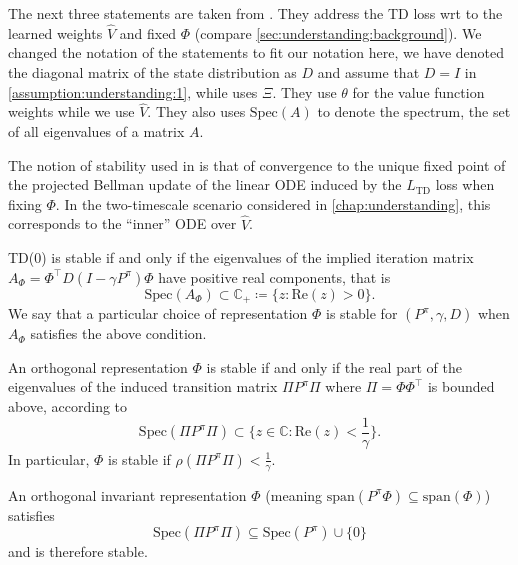 The next three statements are taken from \textcite{ghosh2020representations}.  They address the TD loss wrt to the learned weights $\hat{V}$ and fixed $\Phi$ (compare \autoref{sec:understanding:background}).
We changed the notation of the statements to fit our notation here, we have denoted the diagonal matrix of the state distribution as $D$ and assume that $D=I$ in \autoref{assumption:understanding:1}, while \textcite{ghosh2020representations} uses $\Xi$. They use $\theta$ for the value function weights while we use $\hat{V}$.
They also uses $\text{Spec}(A)$ to denote the spectrum, the set of all eigenvalues of a matrix $A$.

The notion of stability used in \textcite{ghosh2020representations} is that of convergence to the unique fixed point of the projected Bellman update of the linear ODE induced by the $L_\text{TD}$ loss when fixing $\Phi$. In the two-timescale scenario considered in \autoref{chap:understanding}, this corresponds to the ``inner'' ODE over $\hat{V}$.

\begin{lemma}\label{prop:understanding:gosh1}
    TD(0) is stable if and only if the eigenvalues of the implied iteration matrix $A_\Phi = \Phi^\top D (I - \gamma P^\pi) \Phi$ have positive real components, that is $$\text{Spec}\left(A_\Phi\right) \subset \mathbb{C}_+ \coloneq \{z : \text{Re}(z) > 0 \}.$$
    We say that a particular choice of representation $\Phi$ is stable for $(P^\pi, \gamma, D)$ when $A_\Phi$ satisfies the above condition.
\end{lemma}

\begin{lemma}\label{prop:understanding:gosh2}
    An orthogonal representation $\Phi$ is stable if and only if the real part of the eigenvalues of the induced transition matrix $\Pi P^\pi \Pi$ where $\Pi = \Phi\Phi^\top$ is bounded above, according to $$\text{Spec}\left(\Pi P^\pi \Pi\right) \subset \{z \in \mathbb{C}: \text{Re}(z) < \frac{1}{\gamma} \}.$$
    In particular, $\Phi$ is stable if $\rho(\Pi P^\pi\Pi) < \frac{1}{\gamma}$.
\end{lemma}

\begin{lemma}\label{prop:understanding:gosh3}
    An orthogonal invariant representation $\Phi$ (meaning $\text{span}(P^\pi \Phi) \subseteq \text{span}(\Phi)$) satisfies $$\text{Spec}\left(\Pi P^\pi \Pi\right) \subseteq \text{Spec}(P^\pi) \cup \{0\}$$ and is therefore stable.
\end{lemma}

